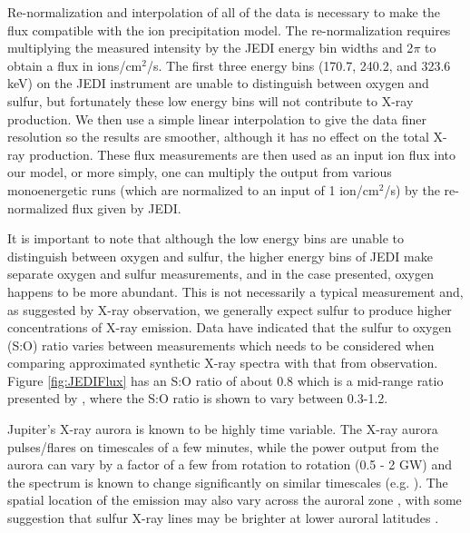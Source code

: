 \documentclass[draft]{agujournal2018}
\begin{document}
Re-normalization and interpolation of all of the data is necessary to make the flux compatible with the ion precipitation model.
The re-normalization requires multiplying the measured intensity by the JEDI energy bin widths \citep{mauk2017ssr} and 2$\pi$ to obtain a flux in ions/cm$^2$/s.
The first three energy bins (170.7, 240.2, and 323.6 keV) on the JEDI instrument are unable to distinguish between oxygen and sulfur, but fortunately these low energy bins will not contribute to X-ray production.
We then use a simple linear interpolation to give the data finer resolution so the results are smoother, although it has no effect on the total X-ray production.
These flux measurements are then used as an input ion flux into our model, or more simply, one can multiply the output from various monoenergetic runs (which are normalized to an input of 1 ion/cm$^2$/s) by the re-normalized flux given by JEDI.

It is important to note that although the low energy bins are unable to distinguish between oxygen and sulfur, the higher energy bins of JEDI make separate oxygen and sulfur measurements, and in the case presented, oxygen happens to be more abundant.
This is not necessarily a typical measurement and, as suggested by X-ray observation, we generally expect sulfur to produce higher concentrations of X-ray emission.
Data have indicated that the sulfur to oxygen (S:O) ratio varies between measurements \citep{delamere2005,dougherty2017,kim2019} which needs to be considered when comparing approximated synthetic X-ray spectra with that from observation.
Figure \ref{fig:JEDIFlux} has an S:O ratio of about 0.8 which is a mid-range ratio presented by \citet{radioti2005,radioti2006}, where the S:O ratio is shown to vary between 0.3-1.2.

Jupiter's X-ray aurora is known to be highly time variable.
The X-ray aurora pulses/flares on timescales of a few minutes, while the power output from the aurora can vary by a factor of a few from rotation to rotation (0.5 - 2 GW) and the spectrum is known to change significantly on similar timescales (e.g. \citet{branduardi2007,elsner2005,hui2010}).
The spatial location of the emission may also vary across the auroral zone \citep{dunn2017,gladstone2002,jackman2018}, with some suggestion that sulfur X-ray lines may be brighter at lower auroral latitudes \citep{dunn2016}.
\end{document}
